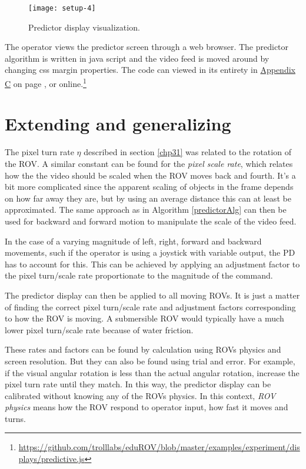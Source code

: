\begin{figure}[h!]
    \centering
    \texttt{[image: setup-4]}
    \caption{Predictor display visualization.}
    \label{predictorvis}
\end{figure}

\clearpage
\restoregeometry

The operator views the predictor screen through a web browser. The predictor algorithm is written in java script and the video feed is moved around by changing css margin properties. The code can viewed in its entirety in \hyperref[appPredict]{Appendix C} on page \pageref{appPredict}, or online.\footnote{\url{https://github.com/trolllabs/eduROV/blob/master/examples/experiment/displays/predictive.js}}


\section{Extending and generalizing}\label{expand}

The pixel turn rate $\eta$ described in section \ref{chp31} was related to the rotation of the ROV. A similar constant can be found for the \emph{pixel scale rate}, which relates how the the video should be scaled when the ROV moves back and fourth. It's a bit more complicated since the apparent scaling of objects in the frame depends on how far away they are, but by using an average distance this can at least be approximated. The same approach as in Algorithm \ref{predictorAlg} can then be used for backward and forward motion to manipulate the scale of the video feed.

In the case of a varying magnitude of left, right, forward and backward movements, such if the operator is using a joystick with variable output, the PD has to account for this. This can be achieved by applying an adjustment factor to the pixel turn/scale rate proportionate to the magnitude of the command.

The predictor display can then be applied to all moving ROVs. It is just a matter of finding the correct pixel turn/scale rate and adjustment factors corresponding to how the ROV is moving. A submersible ROV would typically have a much lower pixel turn/scale rate because of water friction.

These rates and factors can be found by calculation using ROVs physics and screen resolution. But they can also be found using trial and error. For example, if the visual angular rotation is less than the actual angular rotation, increase the pixel turn rate until they match. In this way, the predictor display can be calibrated without knowing any of the ROVs physics. In this context, \emph{ROV physics} means how the ROV respond to operator input, how fast it moves and turns.